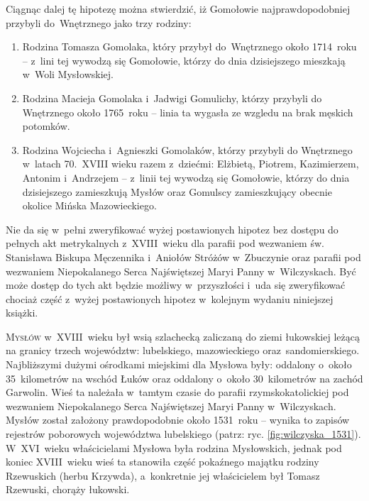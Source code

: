 Ciągnąc dalej tę hipotezę można stwierdzić, iż Gomołowie najprawdopodobniej 
przybyli do~Wnętrznego jako trzy rodziny:

\begin{enumerate}
    \item Rodzina Tomasza Gomolaka, który przybył do~Wnętrznego około 
    1714~roku -- z~lini tej wywodzą się Gomołowie, którzy do dnia dzisiejszego 
    mieszkają w~Woli Mysłowskiej.
    \item Rodzina Macieja Gomolaka i~Jadwigi Gomulichy, którzy przybyli do 
    Wnętrznego około 1765~roku -- linia ta wygasła ze wzgledu na brak 
    męskich potomków.
    \item Rodzina Wojciecha i~Agnieszki Gomolaków, którzy przybyli do 
    Wnętrznego w~latach 70.~XVIII wieku razem z~dziećmi: Elżbietą, Piotrem,
    Kazimierzem, Antonim i~Andrzejem -- z~linii tej wywodzą się Gomołowie, 
    którzy do dnia dzisiejszego zamieszkują Mysłów oraz Gomulscy 
    zamieszkujący obecnie okolice Mińska Mazowieckiego.
\end{enumerate}

Nie da się w~pełni zweryfikować wyżej postawionych hipotez bez dostępu do 
pełnych akt metrykalnych z~XVIII~wieku dla parafii pod wezwaniem św. 
Stanisława Biskupa Męczennika i~Aniołów Stróżów w~Zbuczynie oraz parafii pod 
wezwaniem Niepokalanego Serca Najświętszej Maryi Panny w~Wilczyskach. Być może 
dostęp do tych akt będzie możliwy w~przyszłości i~uda się zweryfikować chociaż 
część z~wyżej postawionych hipotez w~kolejnym wydaniu niniejszej książki.

\newpage
\ifodd\value{page}\hbox{}\newpage\fi



{}

\lettrine[lines=5, lhang=0.1]{M}{ysłów} w~XVIII~wieku był wsią szlachecką
zaliczaną do ziemi łukowskiej leżącą na granicy trzech województw: lubelskiego,
mazowieckiego oraz~sandomierskiego. Najbliższymi dużymi ośrodkami miejskimi
dla Mysłowa były: oddalony o~około 35~kilometrów na wschód Łuków oraz oddalony
o~około 30~kilometrów na zachód Garwolin. Wieś ta należała w~tamtym czasie do
parafii rzymskokatolickiej pod wezwaniem Niepokalanego Serca Najświętszej
Maryi Panny w~Wilczyskach. Mysłów został założony prawdopodobnie około
1531~roku -- wynika to zapisów rejestrów poborowych województwa lubelskiego
\cite{apawinski} (patrz: ryc. \ref{fig:wilczyska_1531}). W~XVI~wieku
właścicielami Mysłowa była rodzina Mysłowskich, jednak pod koniec XVIII~wieku
wieś ta stanowiła część pokaźnego majątku rodziny Rzewuskich (herbu Krzywda),
a~konkretnie jej właścicielem był Tomasz Rzewuski, chorąży łukowski.
\nocite{sulimierski}

